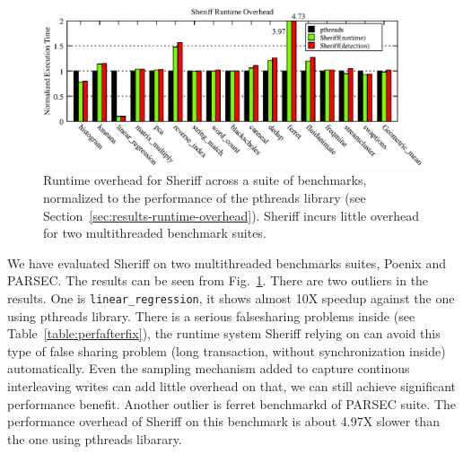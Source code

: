 \begin{figure}[!t]
\centering
\includegraphics[width=6in]{figure/performance}
\caption{Runtime overhead for Sheriff across a suite of benchmarks,
  normalized to the performance of the pthreads library (see
  Section~\ref{sec:results-runtime-overhead}). Sheriff incurs little
  overhead for two multithreaded benchmark suites.
\label{fig:overhead}}
\end{figure}
We have evaluated Sheriff on two multithreaded benchmarks suites, Poenix and PARSEC. 
The results can be seen from Fig.~\ref{fig:overhead}. 
There are two outliers in the results. One is \texttt{linear\_regression}, 
it shows almost 10X speedup against the one using pthreads library. 
There is a serious falsesharing problems inside (see Table~\ref{table:perfafterfix}), the runtime system
Sheriff relying on can avoid this type of false sharing problem (long transaction, without synchronization inside)
automatically. Even the sampling mechanism added to capture continous interleaving writes can add little overhead
on that, we can still achieve significant performance benefit. 
Another outlier is ferret benchmarkd of PARSEC suite. The performance overhead of Sheriff on this benchmark
is about 4.97X slower than the one using pthreads libarary. 

